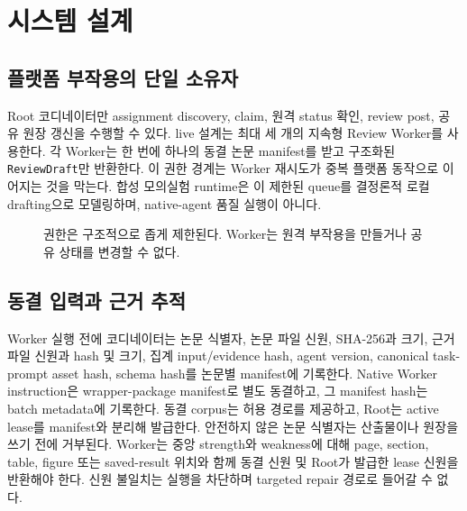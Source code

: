 \documentclass[11pt,a4paper]{article}
\begin{document}
\section{시스템 설계}

\subsection{플랫폼 부작용의 단일 소유자}

Root 코디네이터만 assignment discovery, claim, 원격 status 확인, review post,
공유 원장 갱신을 수행할 수 있다. live 설계는 최대 세 개의 지속형 Review
Worker를 사용한다. 각 Worker는 한 번에 하나의 동결 논문 manifest를 받고
구조화된 \texttt{ReviewDraft}만 반환한다. 이 권한 경계는 Worker 재시도가
중복 플랫폼 동작으로 이어지는 것을 막는다. 합성 모의실험 runtime은 이
제한된 queue를 결정론적 로컬 drafting으로 모델링하며, native-agent 품질
실행이 아니다.

\begin{figure}[H]
  \centering
  \caption{권한은 구조적으로 좁게 제한된다. Worker는 원격 부작용을 만들거나
  공유 상태를 변경할 수 없다.}
  \label{fig:architecture}
\end{figure}

\subsection{동결 입력과 근거 추적}

Worker 실행 전에 코디네이터는 논문 식별자, 논문 파일 신원, SHA-256과 크기,
근거 파일 신원과 hash 및 크기, 집계 input/evidence hash, agent version,
canonical task-prompt asset hash, schema hash를 논문별 manifest에 기록한다.
Native Worker instruction은 wrapper-package manifest로 별도 동결하고, 그
manifest hash는 batch metadata에 기록한다. 동결 corpus는 허용 경로를
제공하고, Root는 active lease를 manifest와 분리해 발급한다. 안전하지 않은
논문 식별자는 산출물이나 원장을 쓰기 전에 거부된다. Worker는 중앙 strength와
weakness에 대해 page, section, table, figure 또는 saved-result 위치와 함께
동결 신원 및 Root가 발급한 lease 신원을 반환해야 한다. 신원 불일치는 실행을
차단하며 targeted repair 경로로 들어갈 수 없다.
\end{document}
